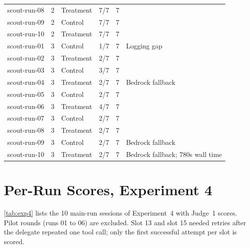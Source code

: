 \documentclass[11pt,a4paper]{article}
\begin{document}
\begin{table}[h]
\begin{tabular}{lllrrp{4.5cm}}
scout-run-08 & 2 & Treatment & 7/7 & 7 & \\
scout-run-09 & 2 & Control   & 7/7 & 7 & \\
scout-run-10 & 2 & Treatment & 7/7 & 7 & \\
\addlinespace
scout-run-01 & 3 & Control   & 1/7 & 7 & Logging gap \\
scout-run-02 & 3 & Treatment & 2/7 & 7 & \\
scout-run-03 & 3 & Control   & 3/7 & 7 & \\
scout-run-04 & 3 & Treatment & 2/7 & 7 & Bedrock fallback \\
scout-run-05 & 3 & Control   & 2/7 & 7 & \\
scout-run-06 & 3 & Treatment & 4/7 & 7 & \\
scout-run-07 & 3 & Control   & 2/7 & 7 & \\
scout-run-08 & 3 & Treatment & 2/7 & 7 & \\
scout-run-09 & 3 & Control   & 2/7 & 7 & Bedrock fallback \\
scout-run-10 & 3 & Treatment & 2/7 & 7 & Bedrock fallback; 780s wall time \\
\bottomrule
\end{tabular}
\end{table}

\section{Per-Run Scores, Experiment 4}
\label{app:exp4}

\autoref{tab:exp4} lists the 10 main-run sessions of Experiment~4 with Judge~1 scores. Pilot rounds (runs 01 to 06) are excluded. Slot 13 and slot 15 needed retries after the delegate repeated one tool call; only the first successful attempt per slot is scored.
\end{document}

